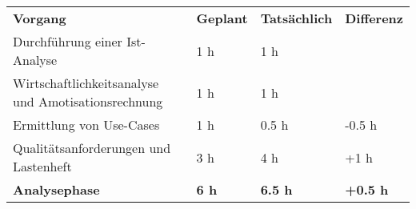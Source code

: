 \begin{tabularx}{\textwidth}{Xlll}
\rowcolor{heading}\textbf{Vorgang} & \textbf{Geplant} & \textbf{Tatsächlich} & \textbf{Differenz} \\
Durchführung einer Ist-Analyse & 1 h   & 1 h   &  \\
\rowcolor{odd}Wirtschaftlichkeitsanalyse und Amotisationsrechnung & 1 h   & 1 h   &  \\
Ermittlung von Use-Cases & 1 h   & 0.5 h   & -0.5 h \\
\rowcolor{odd}Qualitätsanforderungen und Lastenheft & 3 h   & 4 h   & +1 h \\
\hline
\hline
\rowcolor{heading}\textbf{Analysephase} & \textbf{6 h} & \textbf{6.5 h} & \textbf{+0.5 h} \\
\end{tabularx}
